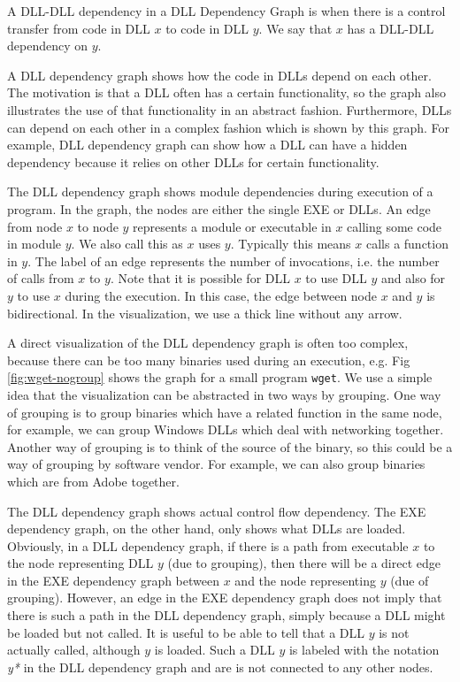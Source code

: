 \begin{definition}
A DLL-DLL dependency in a DLL Dependency Graph
is when there is a control transfer from code in
DLL $x$ to code in DLL $y$.
We say that $x$ has a DLL-DLL dependency on $y$.
\end{definition}

A DLL dependency graph shows how the code in DLLs depend
on each other. The motivation is that a DLL often has a certain functionality,
so the graph also illustrates the use of that functionality in an
abstract fashion. Furthermore, DLLs can depend on each other in a complex
fashion which is shown by this graph.
For example, DLL dependency graph can show how a DLL can have
a hidden dependency because it relies on other DLLs for certain functionality.

The DLL dependency graph shows module dependencies during execution
of a program.
In the graph, the nodes are either the single EXE or DLLs.
An edge from node $x$ to node $y$ represents a module or executable
in $x$ calling some code in module $y$.
We also call this as $x$ uses $y$.
Typically this means $x$ calls a function in $y$.
The label of an edge represents the number of invocations, i.e.
the number of calls from $x$ to $y$.
Note that it is possible for DLL $x$ to use DLL $y$ and also for
$y$ to use $x$ during the execution.
In this case, the edge between node $x$ and $y$ is bidirectional.
In the visualization, we use a thick line without any arrow.

A direct visualization of the DLL dependency graph is often too complex,
because there can be too many binaries used during an execution,
e.g. Fig \ref{fig:wget-nogroup} shows the graph for a small program {\tt wget}.
We use a simple idea that the visualization can be abstracted in two ways
by grouping.
One way of grouping is to group binaries which have a related function
in the same node, for example, we can group Windows DLLs which deal with
networking together.
Another way of grouping is to think of the source of the binary, so this
could be a way of grouping by software vendor.
For example, we can also group binaries which are from Adobe together.

The DLL dependency graph shows actual control flow dependency.
The EXE dependency graph, on the other hand, only shows what
DLLs are loaded. Obviously, in a DLL dependency graph,
if there is a path from executable $x$ to the node representing
DLL $y$ (due to grouping), then there will
be a direct edge in the EXE dependency graph between $x$ and the node
representing $y$ (due of grouping).
However, an edge in the EXE dependency graph does not imply that there is
such a path in the DLL dependency graph, simply because a DLL might
be loaded but not called.
It is useful to be able to tell that a DLL $y$ is not actually called,
although $y$ is loaded.
Such a DLL $y$ is labeled with the notation {\it *y*} in the DLL dependency
graph and are is not connected to any other nodes.

